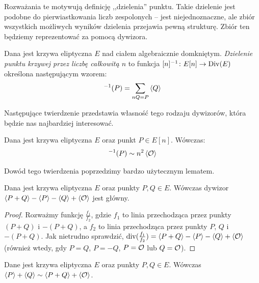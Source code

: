 Rozważania te motywują definicję ,,dzielenia'' punktu.
Takie dzielenie jest podobne do pierwiastkowania liczb zespolonych --
jest niejednoznaczne, ale zbiór wszystkich możliwych wyników dzielenia
przejawia pewną strukturę.
Zbiór ten będziemy reprezentować za pomocą dywizora.

\begin{definition}
Dana jest krzywa eliptyczna $E$ nad ciałem algebraicznie domkniętym.
\emph{Dzielenie punktu krzywej przez liczbę całkowitą $n$}
to funkcja $[n]^{-1} \colon E[n] \to \operatorname{Div}(E)$
określona następującym wzorem:
\begin{equation}
[n]^{-1}(P) = \sum_{nQ = P} \divi{Q}
\end{equation}
\end{definition}

Następujące twierdzenie przedstawia własność tego rodzaju dywizorów,
która będzie nas najbardziej interesować.

\begin{theorem}\label{point_division_divisor_principle_theorem}
Dana jest krzywa eliptyczna $E$ oraz punkt $P \in E[n]$.
Wówczas:
\begin{eqnarray*}
[n]^{-1}(P) \sim n^2\divi{\ecident}
\end{eqnarray*}
\end{theorem}

Dowód tego twierdzenia poprzedzimy bardzo użytecznym lematem.

\begin{lemma}\label{divi_reduction_lemma}
Dana jest krzywa eliptyczna $E$ oraz punkty $P, Q \in E$.
Wówczas dywizor $\left\langle P+Q\right\rangle - \left\langle P\right\rangle - \left\langle Q\right\rangle + \left\langle\mathcal{O}\right\rangle$
jest główny.
\end{lemma}

\begin{proof}
Rozważmy funkcję $\frac{f_1}{f_2}$,
gdzie $f_1$ to linia przechodząca przez punkty $(P+Q)$ i $-(P+Q)$,
a $f_2$ to linia przechodząca przez punkty $P$, $Q$ i $-(P+Q)$.
Jak nietrudno sprawdzić,
$\operatorname{div}(\frac{f_1}{f_2}) = \left\langle P+Q\right\rangle - \left\langle P\right\rangle - \left\langle Q\right\rangle + \left\langle\mathcal{O}\right\rangle$
(również wtedy, gdy $P = Q$, $P = -Q$, $P = \mathcal{O}$ lub $Q = \mathcal{O}$).
\end{proof}

\begin{corollary}\label{divi_sum_reduction_coro}
Dane jest krzywa eliptyczna $E$ oraz punkty $P, Q \in E$.
Wówczas $\left\langle P\right\rangle + \left\langle Q\right\rangle \sim \left\langle P+Q\right\rangle + \left\langle\mathcal{O}\right\rangle$.
\end{corollary}

